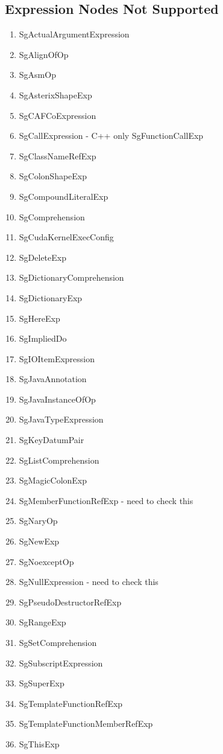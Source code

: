 \documentclass[11pt]{article}
\begin{document}
{\begin{enumeration}
\subsection{Expression Nodes Not Supported}
\begin{enumerate}
\item SgActualArgumentExpression
\item SgAlignOfOp
\item SgAsmOp
\item SgAsterixShapeExp
\item SgCAFCoExpression
\item SgCallExpression - C++ only SgFunctionCallExp
\item SgClassNameRefExp
\item SgColonShapeExp
\item SgCompoundLiteralExp
\item SgComprehension
\item SgCudaKernelExecConfig
\item SgDeleteExp
\item SgDictionaryComprehension
\item SgDictionaryExp
\item SgHereExp
\item SgImpliedDo
\item SgIOItemExpression
\item SgJavaAnnotation
\item SgJavaInstanceOfOp
\item SgJavaTypeExpression
\item SgKeyDatumPair
\item SgListComprehension
\item SgMagicColonExp
\item SgMemberFunctionRefExp - need to check this
\item SgNaryOp
\item SgNewExp
\item SgNoexceptOp
\item SgNullExpression - need to check this
\item SgPseudoDestructorRefExp
\item SgRangeExp
\item SgSetComprehension
\item SgSubscriptExpression
\item SgSuperExp
\item SgTemplateFunctionRefExp
\item SgTemplateFunctionMemberRefExp
\item SgThisExp

\end{enumerate}
\end{enumeration}}
\end{document}
